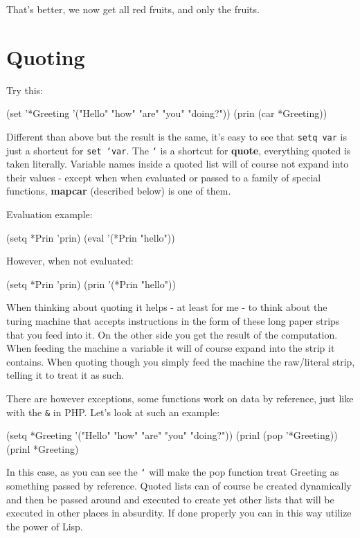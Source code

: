 That's better, we now get all red fruits, and only the fruits.

\section{Quoting}
\label{sec:reg-and-quot-quoting}

Try this:

\begin{wideverbatim}
(set '*Greeting '("Hello" "how" "are" "you" "doing?"))
(prin (car *Greeting))
\end{wideverbatim}

Different than above but the result is the same, it's easy to see that
\texttt{setq var} is just a shortcut for \texttt{set ‘var}. The
\texttt{‘} is a shortcut for \textbf{quote}, everything quoted is
taken literally. Variable names inside a quoted list will of course
not expand into their values - except when when evaluated or passed to
a family of special functions, \textbf{mapcar} (described below) is
one of them.

Evaluation example:

\begin{wideverbatim}
(setq *Prin 'prin)
(eval '(*Prin "hello"))
\end{wideverbatim}

However, when not evaluated:

\begin{wideverbatim}
(setq *Prin 'prin)
(prin '(*Prin "hello"))
\end{wideverbatim}

When thinking about quoting it helps - at least for me - to think about
the turing machine that accepts instructions in the form of these long
paper strips that you feed into it. On the other side you get the result
of the computation. When feeding the machine a variable it will of
course expand into the strip it contains. When quoting though you simply
feed the machine the raw/literal strip, telling it to treat it as such.

There are however exceptions, some functions work on data by reference,
just like with the \texttt{\&} in PHP. Let's look at such an example:

\begin{wideverbatim}
(setq *Greeting '("Hello" "how" "are" "you" "doing?"))
(prinl (pop '*Greeting))
(prinl *Greeting)
\end{wideverbatim}

In this case, as you can see the \texttt{‘} will make the pop function
treat Greeting as something passed by reference. Quoted lists can of
course be created dynamically and then be passed around and executed
to create yet other lists that will be executed in other places in
absurdity. If done properly you can in this way utilize the power of
Lisp.

